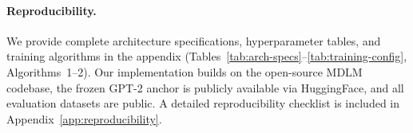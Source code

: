 \documentclass[11pt]{article}
\theoremstyle{remark}
\begin{document}

\paragraph{Reproducibility.} We provide complete architecture specifications, hyperparameter tables, and training algorithms in the appendix (Tables~\ref{tab:arch-specs}--\ref{tab:training-config}, Algorithms~1--2). Our implementation builds on the open-source MDLM codebase, the frozen GPT-2 anchor is publicly available via HuggingFace, and all evaluation datasets are public. A detailed reproducibility checklist is included in Appendix~\ref{app:reproducibility}.

\clearpage



\end{document}
